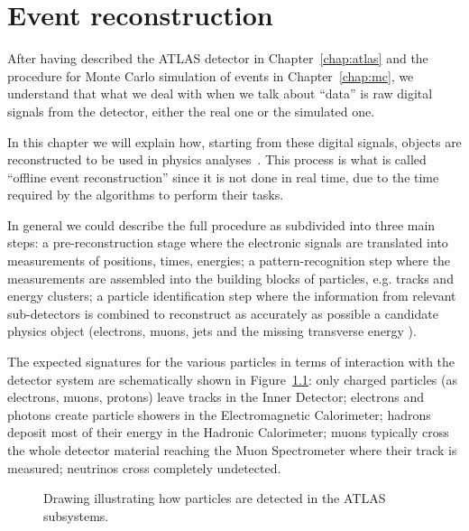 \clearpage{\pagestyle{empty}\cleardoublepage}

\chapter{Event reconstruction}\label{chap:objects}

After having described the ATLAS detector in Chapter~\ref{chap:atlas} 
and the procedure for Monte Carlo simulation of events in Chapter~\ref{chap:mc},
we understand that what we deal with when we talk about ``data'' 
is raw digital signals from the detector,
either the real one or the simulated one.

In this chapter we will explain how, starting from these digital signals,
objects are reconstructed to be used in physics analyses~\cite{Aad:2009wy}. 
This process is what is called ``offline event reconstruction'' since
it is not done in real time, due to the time required by the algorithms
to perform their tasks.

In general we could describe the full procedure as subdivided into
three main steps: a pre-reconstruction stage where the electronic signals are
translated into measurements of positions, times, energies; 
a pattern-recognition step where the measurements
are assembled into the building blocks of particles, e.g. tracks and energy clusters;
a particle identification step where the information from relevant 
sub-detectors
is combined to reconstruct as accurately as possible 
a candidate physics object 
(electrons, muons, jets and the missing transverse energy \met).

The expected signatures for the various particles in terms of interaction
with the detector system are schematically shown in Figure~\ref{fig:decaychart}:
only charged particles (as electrons, muons, protons) leave tracks in the Inner
Detector; electrons and photons create particle showers in 
the Electromagnetic Calorimeter; hadrons deposit most of their energy
in the Hadronic Calorimeter; muons typically cross the whole
detector material reaching the Muon Spectrometer where their track is measured;
neutrinos cross completely undetected.

\begin{figure}[tb]\begin{center}
	\caption{Drawing illustrating how particles are detected in the ATLAS subsystems.
	\label{fig:decaychart}}
\end{center}\end{figure}

